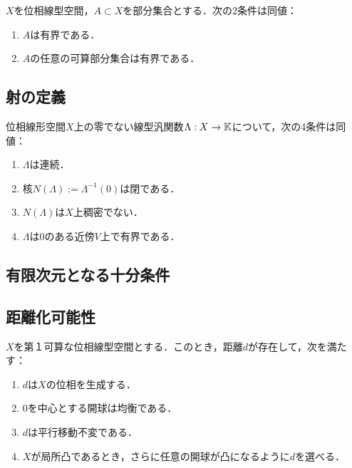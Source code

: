 \documentclass[uplatex,dvipdfmx]{jsreport}
\begin{document}
\begin{proposition}[有界性の特徴付け]
    $X$を位相線型空間，$A\subset X$を部分集合とする．次の2条件は同値：
    \begin{enumerate}
        \item $A$は有界である．
        \item $A$の任意の可算部分集合は有界である．
    \end{enumerate}
\end{proposition}

\subsection{射の定義}

\begin{theorem}[連続性の特徴付け]\label{thm-morphism-of-TVS}
    位相線形空間$X$上の零でない線型汎関数$\Lambda:X\to\mathbb{K}$について，次の4条件は同値：
    \begin{enumerate}
        \item $\Lambda$は連続．
        \item 核$N(\Lambda):=\Lambda^{-1}(0)$は閉である．
        \item $N(\Lambda)$は$X$上稠密でない．
        \item $\Lambda$は$0$のある近傍$V$上で有界である．
    \end{enumerate}
\end{theorem}

\subsection{有限次元となる十分条件}

\subsection{距離化可能性}

\begin{theorem}
    $X$を第１可算な位相線型空間とする．このとき，距離$d$が存在して，次を満たす：
    \begin{enumerate}
        \item $d$は$X$の位相を生成する．
        \item $0$を中心とする開球は均衡である．
        \item $d$は平行移動不変である．
        \item $X$が局所凸であるとき，さらに任意の開球が凸になるように$d$を選べる．
    \end{enumerate}
\end{theorem}
\end{document}
